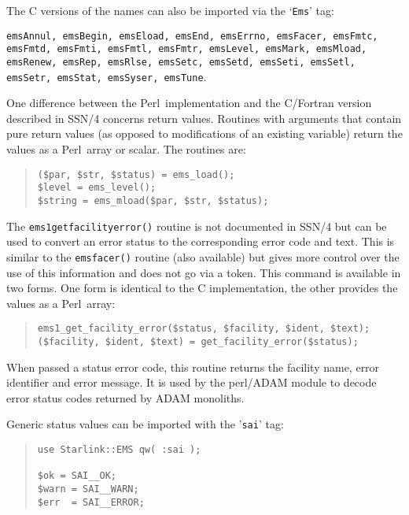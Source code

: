 \documentclass[twoside,11pt]{article}
\newenvironment{myquote}{\begin{quote}\begin{small}}{\end{small}\end{quote}}
\newcommand{\perl}{\xref{\textsf{Perl}}{sun193}{}}
\newcommand{\xref}[3]{#1}
\renewcommand{\_}{\texttt{\symbol{95}}}
\begin{document}
The C versions of the names can also be imported via the `\texttt{Ems}'
tag:

\texttt{emsAnnul, emsBegin, emsEload, emsEnd, emsErrno, emsFacer,
emsFmtc, emsFmtd, emsFmti, emsFmtl, emsFmtr, emsLevel, emsMark, emsMload,
emsRenew, emsRep, emsRlse, emsSetc, emsSetd, emsSeti, emsSetl,
emsSetr, emsStat, emsSyser, emsTune}.

One difference between the \perl\ implementation and the C/Fortran version
described in \xref{SSN/4}{ssn4}{} concerns return values. Routines with
arguments that contain pure return values (as opposed to
modifications of an existing variable) return the values as
a \perl\ array or scalar. The routines are:

\begin{myquote}
\begin{verbatim}
($par, $str, $status) = ems_load();
$level = ems_level();
$string = ems_mload($par, $str, $status);
\end{verbatim}
\end{myquote}

The \texttt{ems1\_get\_facility\_error()} routine is not documented in
\xref{SSN/4}{ssn4}{} but can be used to convert an error status to the
corresponding error code and text. This is similar to the
\texttt{ems\_facer()} routine (also available) but gives more control over the
use of this information and does not go via a token.  This command is
available in two forms. One form is identical to the C implementation, the
other provides the values as a \perl\ array:

\begin{myquote}
\begin{verbatim}
ems1_get_facility_error($status, $facility, $ident, $text);
($facility, $ident, $text) = get_facility_error($status);
\end{verbatim}
\end{myquote}

When passed a status error code, this routine returns the facility
name, error identifier and error message. It is used by the perl/ADAM
module to decode error status codes returned by ADAM monoliths. 

Generic status values can be imported with the '\texttt{sai}' tag:

\begin{myquote}
\begin{verbatim}
use Starlink::EMS qw( :sai );

$ok = SAI__OK;
$warn = SAI__WARN;
$err  = SAI__ERROR;
\end{verbatim}
\end{myquote}
\end{document}
